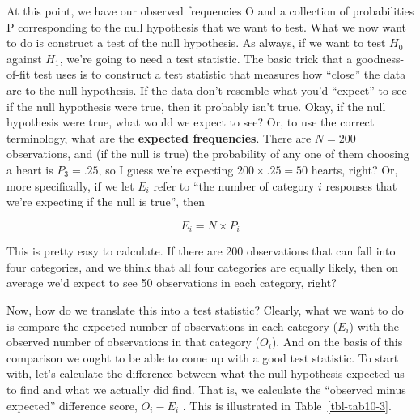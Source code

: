 \documentclass[
  a4paper,
]{book}
\begin{document}
At this point, we have our observed frequencies O and a collection of
probabilities P corresponding to the null hypothesis that we want to
test. What we now want to do is construct a test of the null hypothesis.
As always, if we want to test \(H_0\) against \(H_1\), we're going to
need a test statistic. The basic trick that a goodness-of-fit test uses
is to construct a test statistic that measures how ``close'' the data
are to the null hypothesis. If the data don't resemble what you'd
``expect'' to see if the null hypothesis were true, then it probably
isn't true. Okay, if the null hypothesis were true, what would we expect
to see? Or, to use the correct terminology, what are the
\textbf{expected frequencies}. There are \(N = 200\) observations, and
(if the null is true) the probability of any one of them choosing a
heart is \(P_3 = .25\), so I guess we're expecting
\(200 \times .25 = 50\) hearts, right? Or, more specifically, if we let
\(E_i\) refer to ``the number of category \(i\) responses that we're
expecting if the null is true'', then

\[E_i=N \times P_i\]

This is pretty easy to calculate. If there are 200 observations that can
fall into four categories, and we think that all four categories are
equally likely, then on average we'd expect to see 50 observations in
each category, right?

Now, how do we translate this into a test statistic? Clearly, what we
want to do is compare the expected number of observations in each
category (\(E_i\)) with the observed number of observations in that
category (\(O_i\)). And on the basis of this comparison we ought to be
able to come up with a good test statistic. To start with, let's
calculate the difference between what the null hypothesis expected us to
find and what we actually did find. That is, we calculate the ``observed
minus expected'' difference score, \(O_i - E_i\) . This is illustrated
in Table~\ref{tbl-tab10-3}.

\hypertarget{tbl-tab10-3}{}
 
  \providecommand{\huxb}[2]{\arrayrulecolor[RGB]{#1}\global\arrayrulewidth=#2pt}
  \providecommand{\huxvb}[2]{\color[RGB]{#1}\vrule width #2pt}
  \providecommand{\huxtpad}[1]{\rule{0pt}{#1}}
  \providecommand{\huxbpad}[1]{\rule[-#1]{0pt}{#1}}
\end{document}
